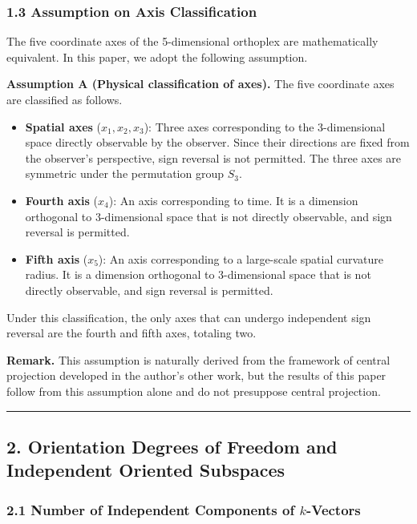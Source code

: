 \documentclass[a4paper,11pt]{article}
\providecommand{\tightlist}{\setlength{\itemsep}{0pt}\setlength{\parskip}{0pt}}
\begin{document}
\subsubsection*{1.3 Assumption on Axis Classification}

The five coordinate axes of the 5-dimensional orthoplex are mathematically equivalent. In this paper, we adopt the following assumption.

\textbf{Assumption A (Physical classification of axes).} The five coordinate axes are classified as follows.

\begin{itemize}
\tightlist
\item
  \textbf{Spatial axes} ($x_1, x_2, x_3$): Three axes corresponding to the 3-dimensional space directly observable by the observer. Since their directions are fixed from the observer's perspective, sign reversal is not permitted. The three axes are symmetric under the permutation group $S_3$.
\item
  \textbf{Fourth axis} ($x_4$): An axis corresponding to time. It is a dimension orthogonal to 3-dimensional space that is not directly observable, and sign reversal is permitted.
\item
  \textbf{Fifth axis} ($x_5$): An axis corresponding to a large-scale spatial curvature radius. It is a dimension orthogonal to 3-dimensional space that is not directly observable, and sign reversal is permitted.
\end{itemize}

Under this classification, the only axes that can undergo independent sign reversal are the fourth and fifth axes, totaling two.

\textbf{Remark.} This assumption is naturally derived from the framework of central projection developed in the author's other work, but the results of this paper follow from this assumption alone and do not presuppose central projection.

\begin{center}\rule{0.5\linewidth}{0.5pt}\end{center}

\subsection*{2. Orientation Degrees of Freedom and Independent Oriented Subspaces}

\subsubsection*{2.1 Number of Independent Components of $k$-Vectors}
\end{document}

